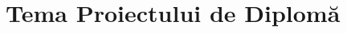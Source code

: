 \chapter*{Tema Proiectului de Diplomă}

\thispagestyle{front}
\pagestyle{front}

\newpage \
\newpage \

